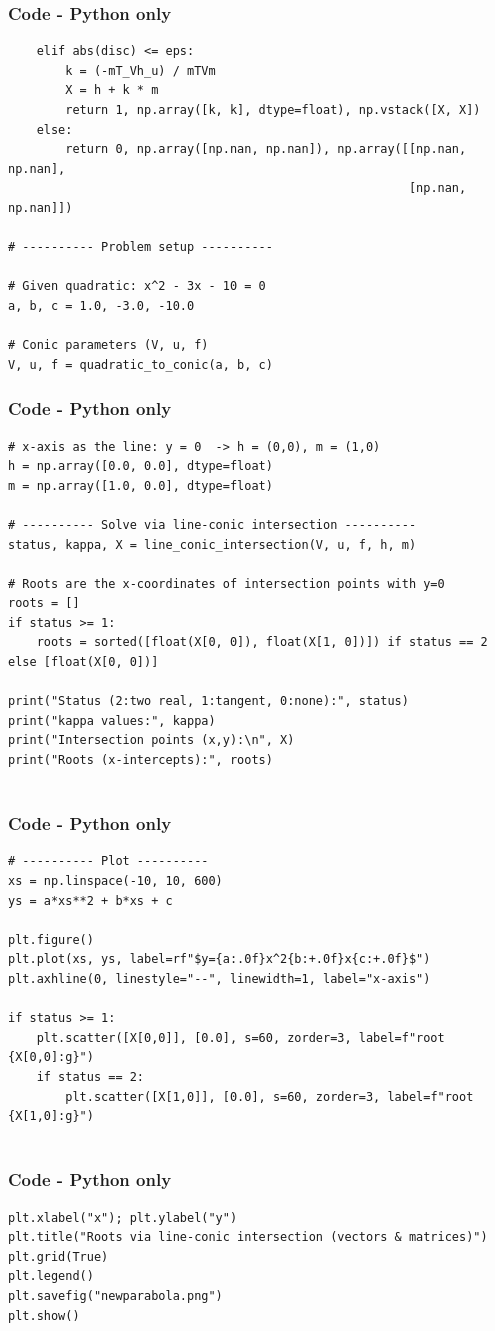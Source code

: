 \documentclass{beamer}
\theoremstyle{remark}
\numberwithin{equation}{section}
\begin{document}
\begin{frame}[fragile]
\frametitle{Code - Python only}
\begin{lstlisting}
    elif abs(disc) <= eps:
        k = (-mT_Vh_u) / mTVm
        X = h + k * m
        return 1, np.array([k, k], dtype=float), np.vstack([X, X])
    else:
        return 0, np.array([np.nan, np.nan]), np.array([[np.nan, np.nan],
                                                        [np.nan, np.nan]])

# ---------- Problem setup ----------

# Given quadratic: x^2 - 3x - 10 = 0
a, b, c = 1.0, -3.0, -10.0

# Conic parameters (V, u, f)
V, u, f = quadratic_to_conic(a, b, c)

\end{lstlisting}
\end{frame}

\begin{frame}[fragile]
\frametitle{Code - Python only}
\begin{lstlisting}
# x-axis as the line: y = 0  -> h = (0,0), m = (1,0)
h = np.array([0.0, 0.0], dtype=float)
m = np.array([1.0, 0.0], dtype=float)

# ---------- Solve via line-conic intersection ----------
status, kappa, X = line_conic_intersection(V, u, f, h, m)

# Roots are the x-coordinates of intersection points with y=0
roots = []
if status >= 1:
    roots = sorted([float(X[0, 0]), float(X[1, 0])]) if status == 2 else [float(X[0, 0])]

print("Status (2:two real, 1:tangent, 0:none):", status)
print("kappa values:", kappa)
print("Intersection points (x,y):\n", X)
print("Roots (x-intercepts):", roots)


\end{lstlisting}
\end{frame}

\begin{frame}[fragile]
\frametitle{Code - Python only}
\begin{lstlisting}
# ---------- Plot ----------
xs = np.linspace(-10, 10, 600)
ys = a*xs**2 + b*xs + c

plt.figure()
plt.plot(xs, ys, label=rf"$y={a:.0f}x^2{b:+.0f}x{c:+.0f}$")
plt.axhline(0, linestyle="--", linewidth=1, label="x-axis")

if status >= 1:
    plt.scatter([X[0,0]], [0.0], s=60, zorder=3, label=f"root {X[0,0]:g}")
    if status == 2:
        plt.scatter([X[1,0]], [0.0], s=60, zorder=3, label=f"root {X[1,0]:g}")
 

\end{lstlisting}
\end{frame}

\begin{frame}[fragile]
\frametitle{Code - Python only}
\begin{lstlisting}
plt.xlabel("x"); plt.ylabel("y")
plt.title("Roots via line-conic intersection (vectors & matrices)")
plt.grid(True)
plt.legend()
plt.savefig("newparabola.png")
plt.show()
 
 

\end{lstlisting}
\end{frame}
\end{document}
